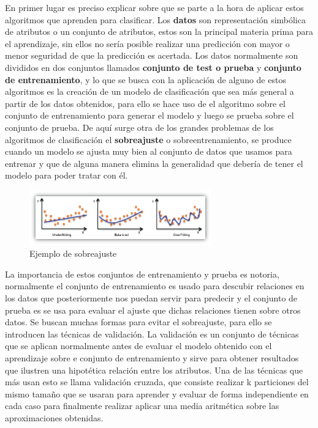\documentclass[a4paper, 11pt]{article} %
\begin{document}
En primer lugar es preciso explicar sobre que se parte a la hora de aplicar estos algoritmos que aprenden para clasificar. Los \textbf{datos} son representación simbólica de atributos o un conjunto de atributos, estos son la principal materia prima para el aprendizaje, sin ellos no sería posible realizar una predicción con mayor o menor seguridad de que la predicción es acertada. Los datos normalmente son divididos en dos conjuntos llamados \textbf{conjunto de test o prueba} y \textbf{conjunto de entrenamiento}, y lo que se busca con la aplicación de alguno de estos algoritmos es la creación de un modelo de clasificación que sea más general a partir de los datos obtenidos, para ello se hace uso de el algoritmo sobre el conjunto de entrenamiento para generar el modelo y luego se prueba sobre el conjunto de prueba. De aquí surge otra de los grandes problemas de los algoritmos de clasificación el \textbf{sobreajuste} o sobreentrenamiento, se produce cuando un modelo se ajusta muy bien al conjunto de datos que usamos para entrenar y que de alguna manera elimina la generalidad que debería de tener el modelo para poder tratar con él.
\begin{figure}[H]
\centering
\includegraphics[width=0.7\textwidth]{overfitting.PNG}
\caption{Ejemplo de sobreajuste}
\label{Ejemplo de sobreajuste}
\end{figure}
La importancia de estos conjuntos de entrenamiento y prueba es notoria, normalmente el conjunto de entrenamiento es usado para descubir relaciones en los datos que posteriormente nos puedan servir para predecir y el conjunto de prueba es se usa para evaluar el ajuste que dichas relaciones tienen sobre otros datos. Se buscan muchas formas para evitar el sobreajuste, para ello se introducen las técnicas de validación. La validación es un conjunto de técnicas que se aplican normalmente antes de evaluar el modelo obtenido con el aprendizaje sobre e conjunto de entrenamiento y sirve para obtener resultados que ilustren una hipotética relación entre los atributos. Una de las técnicas que más usan esto se llama validación cruzada, que consiste realizar k particiones del mismo tamaño que se usaran para aprender y evaluar de forma independiente en cada caso para finalmente realizar aplicar una media aritmética sobre las aproximaciones obtenidas.
\end{document}
